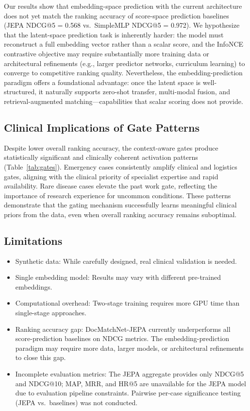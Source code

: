 \documentclass[journal]{IEEEtran}
\begin{document}
Our results show that embedding-space prediction with the current
architecture does not yet match the ranking accuracy of score-space
prediction baselines (JEPA NDCG@5 = 0.568 vs.\ SimpleMLP NDCG@5
= 0.972). We hypothesize that the latent-space prediction task is
inherently harder: the model must reconstruct a full embedding
vector rather than a scalar score, and the InfoNCE contrastive
objective may require substantially more training data or
architectural refinements (e.g., larger predictor networks,
curriculum learning) to converge to competitive ranking quality.
Nevertheless, the embedding-prediction paradigm offers a
foundational advantage: once the latent space is well-structured,
it naturally supports zero-shot transfer, multi-modal fusion,
and retrieval-augmented matching---capabilities that scalar
scoring does not provide.

\subsection{Clinical Implications of Gate Patterns}

Despite lower overall ranking accuracy, the context-aware gates
produce statistically significant and clinically coherent
activation patterns (Table~\ref{tab:gates}). Emergency cases
consistently amplify clinical and logistics gates, aligning with
the clinical priority of specialist expertise and rapid
availability. Rare disease cases elevate the past work gate,
reflecting the importance of research experience for uncommon
conditions. These patterns demonstrate that the gating mechanism
successfully learns meaningful clinical priors from the data,
even when overall ranking accuracy remains suboptimal.

\subsection{Limitations}

\begin{itemize}
\item Synthetic data: While carefully designed, real clinical
validation is needed.
\item Single embedding model: Results may vary with different
pre-trained embeddings.
\item Computational overhead: Two-stage training requires more
GPU time than single-stage approaches.
\item Ranking accuracy gap: DocMatchNet-JEPA currently
underperforms all score-prediction baselines on NDCG metrics.
The embedding-prediction paradigm may require more data,
larger models, or architectural refinements to close this gap.
\item Incomplete evaluation metrics: The JEPA aggregate provides
only NDCG@5 and NDCG@10; MAP, MRR, and HR@5 are unavailable
for the JEPA model due to evaluation pipeline constraints.
Pairwise per-case significance testing (JEPA vs.\ baselines)
was not conducted.
\end{itemize}
\end{document}
